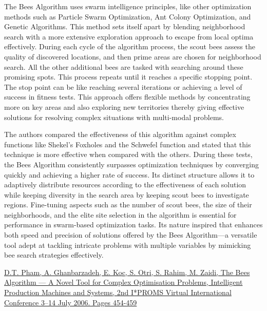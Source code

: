 \documentclass{article}
\begin{document}
The Bees Algorithm uses swarm intelligence principles, like other optimization methods such as Particle Swarm Optimization, Ant Colony Optimization, and Genetic Algorithms. This method sets itself apart by blending neighborhood search with a more extensive exploration approach to escape from local optima effectively. During each cycle of the algorithm process, the scout bees assess the quality of discovered locations, and then prime areas are chosen for neighborhood search. All the other additional bees are tasked with searching around these promising spots. This process repeats until it reaches a specific stopping point. The stop point can be like reaching several iterations or achieving a level of success in fitness tests. This approach offers flexible methods by concentrating more on key areas and also exploring new territories thereby giving effective solutions for resolving complex situations with multi-modal problems. 

The authors compared the effectiveness of this algorithm against complex functions like Shekel’s Foxholes and the Schwefel function and stated that this technique is more effective when compared with the others. During these tests, the Bees Algorithm consistently surpasses optimization techniques by converging quickly and achieving a higher rate of success. Its distinct structure allows it to adaptively distribute resources according to the effectiveness of each solution while keeping diversity in the search area by keeping scout bees to investigate regions. Fine-tuning aspects such as the number of scout bees, the size of their neighborhoods, and the elite site selection in the algorithm is essential for performance in swarm-based optimization tasks. Its nature inspired that enhances both speed and precision of solutions offered by the Bees Algorithm—a versatile tool adept at tackling intricate problems with multiple variables by mimicking bee search strategies effectively.

 
\href{https://www.sciencedirect.com/science/article/abs/pii/B978008045157250081X}{
D.T. Pham, A. Ghanbarzadeh, E. Koç, S. Otri, S. Rahim, M. Zaidi, The Bees Algorithm — A Novel Tool for Complex Optimisation Problems, Intelligent Production Machines and Systems, 2nd I*PROMS Virtual International Conference 3–14 July 2006. Pages 454-459}
\end{document}
